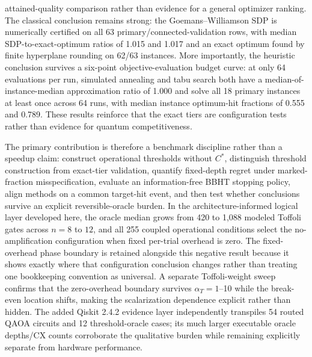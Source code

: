 \documentclass[5p,times]{elsarticle}
\begin{document}
attained-quality comparison rather than evidence for a general optimizer ranking. The classical conclusion remains strong: the Goemans--Williamson SDP is numerically certified on all 63 primary/connected-validation rows, with median SDP-to-exact-optimum ratios of 1.015 and 1.017 and an exact optimum found by finite hyperplane rounding on 62/63 instances. More importantly, the heuristic conclusion survives a six-point objective-evaluation budget curve: at only 64 evaluations per run, simulated annealing and tabu search both have a median-of-instance-median approximation ratio of 1.000 and solve all 18 primary instances at least once across 64 runs, with median instance optimum-hit fractions of 0.555 and 0.789. These results reinforce that the exact tiers are configuration tests rather than evidence for quantum competitiveness.

The primary contribution is therefore a benchmark discipline rather than a speedup claim: construct operational thresholds without $C^*$, distinguish threshold construction from exact-tier validation, quantify fixed-depth regret under marked-fraction misspecification, evaluate an information-free BBHT stopping policy, align methods on a common target-hit event, and then test whether conclusions survive an explicit reversible-oracle burden. In the architecture-informed logical layer developed here, the oracle median grows from 420 to 1,088 modeled Toffoli gates across $n=8$ to $12$, and all 255 coupled operational conditions select the no-amplification configuration when fixed per-trial overhead is zero. The fixed-overhead phase boundary is retained alongside this negative result because it shows exactly where that configuration conclusion changes rather than treating one bookkeeping convention as universal. A separate Toffoli-weight sweep confirms that the zero-overhead boundary survives $\alpha_T=1$--10 while the break-even location shifts, making the scalarization dependence explicit rather than hidden. The added Qiskit 2.4.2 evidence layer independently transpiles 54 routed QAOA circuits and 12 threshold-oracle cases; its much larger executable oracle depths/CX counts corroborate the qualitative burden while remaining explicitly separate from hardware performance.
\end{document}
